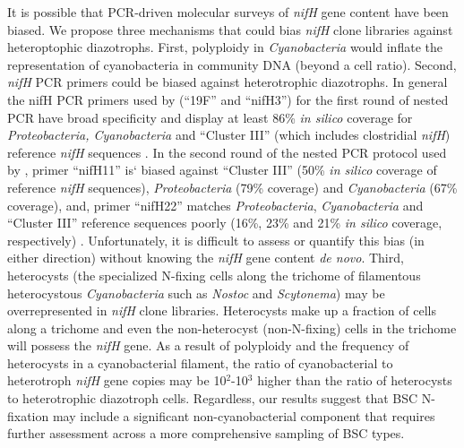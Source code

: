 It is possible that PCR-driven molecular surveys of \textit{nifH}
gene content have been biased. We propose three mechanisms that could bias
\textit{nifH} clone libraries against heteroptophic diazotrophs. First,
polyploidy in \textit{Cyanobacteria} \citep{Griese_2011} would inflate 
the representation of cyanobacteria in community DNA (beyond a cell ratio). 
Second, \textit{nifH} PCR primers could be biased against
heterotrophic diazotrophs. In general the nifH PCR primers used by
\citet{Yeager,14766579,Yeager_2012} (``19F'' and ``nifH3'') for the first round
of nested PCR have broad specificity and display at least 86\% \textit{in
silico} coverage for \textit{Proteobacteria, Cyanobacteria} and ``Cluster III''
(which includes clostridial \textit{nifH}) reference \textit{nifH} sequences
\citep{Gaby_2012}. In the second round of the nested PCR protocol
used by \citet{Yeager,14766579,Yeager_2012}, primer ``nifH11'' is` biased against
``Cluster III'' (50\% \textit{in silico} coverage of reference \textit{nifH}
sequences), \textit{Proteobacteria} (79\% coverage) and
\textit{Cyanobacteria} (67\% coverage), and, primer ``nifH22'' matches
\textit{Proteobacteria}, \textit{Cyanobacteria} and ``Cluster III'' reference
sequences poorly (16\%, 23\% and 21\% \textit{in silico} coverage,
respectively) \citep{Gaby_2012}.  Unfortunately, it is difficult to assess or
quantify this bias (in either direction) without knowing the \textit{nifH} gene
content \textit{de novo}. Third, heterocysts (the specialized N-fixing cells
along the trichome of filamentous heterocystous \textit{Cyanobacteria} such as
\textit{Nostoc} and \textit{Scytonema}) may be overrepresented in \textit{nifH}
clone libraries. Heterocysts make up a fraction of cells
along a trichome and even the non-heterocyst (non-N-fixing) cells in the
trichome will possess the \textit{nifH} gene. As a result of polyploidy and the
frequency of heterocysts in a cyanobacterial filament, the ratio of
cyanobacterial to heterotroph \textit{nifH} gene copies may be 
10$^{2}$-10$^{3}$ higher than the ratio of heterocysts to heterotrophic
diazotroph cells. Regardless, our results suggest that BSC N-fixation may
include a significant non-cyanobacterial component that requires further
assessment across a more comprehensive sampling of BSC types.

